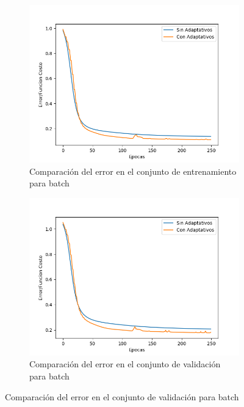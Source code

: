\begin{figure}[!htbp]
\centering
\begin{subfigure}{.5\textwidth}
  \centering
  \includegraphics[width=1\linewidth]{graficos/ej2/adaptativos_promedios_entrenamiento_350.png}
  \caption{Comparación del error en el conjunto de entrenamiento para batch}
  \label{fig:sub1}
\end{subfigure}%
\begin{subfigure}{.5\textwidth}
  \centering
  \includegraphics[width=1\linewidth]{graficos/ej2/adaptativos_promedios_validacion_350.png}
  \caption{Comparación del error en el conjunto de validación para batch}
  \label{fig:sub2}
\end{subfigure}
\end{figure}

